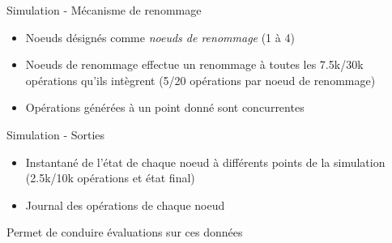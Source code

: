 \begin{frame}{Simulation - Mécanisme de renommage}
  \begin{itemize}
    \item Noeuds désignés comme \emph{noeuds de renommage} (1 à 4)
    \item Noeuds de renommage effectue un renommage à toutes les 7.5k/30k opérations qu'ils intègrent (5/20 opérations \ren par noeud de renommage)
    \item Opérations \ren générées à un point donné sont concurrentes
  \end{itemize}
\end{frame}

\begin{frame}{Simulation - Sorties}
  \begin{itemize}
    \item Instantané de l'état de chaque noeud à différents points de la simulation (2.5k/10k opérations et état final)
    \item Journal des opérations de chaque noeud
  \end{itemize}
  \alert{Permet de conduire évaluations sur ces données}
\end{frame}
